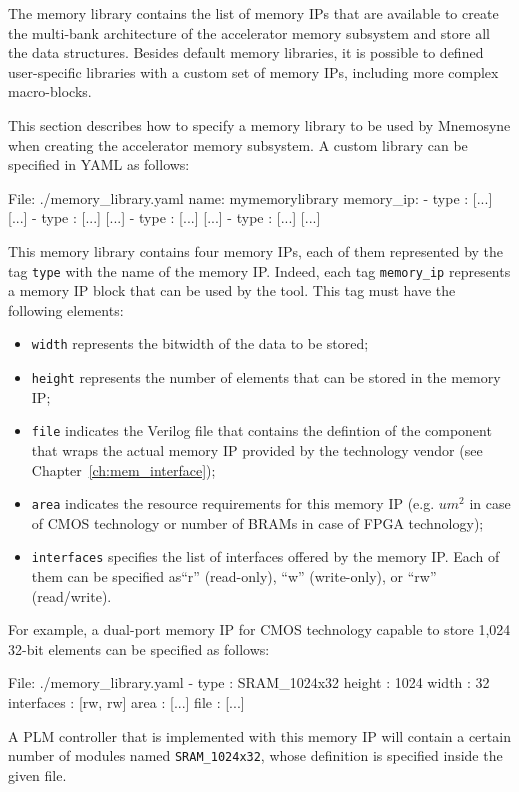 The memory library contains the list of memory IPs that are available to create
the multi-bank architecture of the accelerator memory subsystem and store all
the data structures.  Besides default memory libraries, it is possible to
defined user-specific libraries with a custom set of memory IPs, including more
complex macro-blocks.

This section describes how to specify a memory library to be used by {\sc
Mnemosyne} when creating the accelerator memory subsystem. A custom library can
be specified in YAML as follows:

\begin{myxml}{File: ./memory\_library.yaml}
name: mymemorylibrary
memory_ip:
 - type           : [...]
   [...]
 - type           : [...]
   [...]
 - type           : [...]
   [...]
 - type           : [...]
   [...]
\end{myxml}
\noindent This memory library contains four memory IPs, each of them represented by the tag {\tt type} with 
the name of the memory IP.
Indeed, each tag {\tt memory\_ip} represents a memory IP block that can be used by
the tool. This tag must have the following elements:
\begin{itemize}
\item {\tt width} represents the bitwidth of the data to be stored;
\item {\tt height} represents the number of elements that can be stored in the memory IP;
\item {\tt file} indicates the Verilog file that contains the defintion of the component that wraps the
actual memory IP provided by the technology vendor (see
Chapter~\ref{ch:mem_interface});
\item {\tt area} indicates the resource requirements for this memory IP (e.g. $um^2$ in case
of CMOS technology or number of BRAMs in case of FPGA technology);
\item {\tt interfaces} specifies the list of interfaces offered by the memory IP. Each of them can be specified as``r'' (read-only), ``w'' (write-only), or ``rw'' (read/write).
\end{itemize}
For example, a dual-port memory IP for CMOS technology capable to store 1,024 32-bit elements can be specified 
as follows:
\begin{myxml}{File: ./memory\_library.yaml}
 - type           : SRAM_1024x32
   height         : 1024
   width          : 32
   interfaces     : [rw, rw]
   area           : [...]
   file           : [...]
\end{myxml}
\noindent A PLM controller that is implemented with this memory IP will contain a certain
number of modules named {\tt SRAM\_1024x32}, whose definition is specified
inside the given file.

